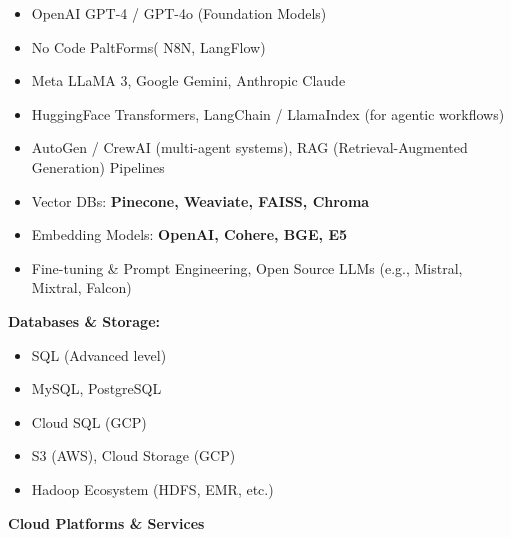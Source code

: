 \documentclass[a4paper]{article}
\begin{document}
\begin{itemize}
\item
  OpenAI GPT-4 / GPT-4o (Foundation Models)
\item
  No Code PaltForms( N8N, LangFlow)
\item
  Meta LLaMA 3, Google Gemini, Anthropic Claude
\item
  HuggingFace Transformers, LangChain / LlamaIndex (for agentic
  workflows)
\item
  AutoGen / CrewAI (multi-agent systems), RAG (Retrieval-Augmented
  Generation) Pipelines
\item
  Vector DBs: \textbf{Pinecone, Weaviate, FAISS, Chroma}
\item
  Embedding Models: \textbf{OpenAI, Cohere, BGE, E5}
\item
  Fine-tuning \& Prompt Engineering, Open Source LLMs (e.g., Mistral,
  Mixtral, Falcon)
\end{itemize}

\textbf{Databases \& Storage:}

\begin{itemize}
\item
  SQL (Advanced level)
\item
  MySQL, PostgreSQL
\item
  Cloud SQL (GCP)
\item
  S3 (AWS), Cloud Storage (GCP)
\item
  Hadoop Ecosystem (HDFS, EMR, etc.)
\end{itemize}

\textbf{Cloud Platforms \& Services}
\end{document}
